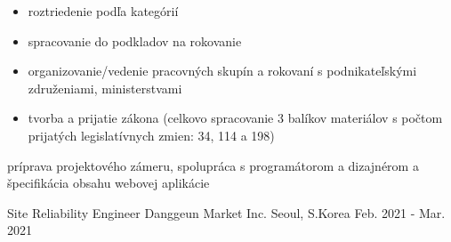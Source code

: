 \begin{cventries}
{\begin{cvitems}
\begin{itemize}[leftmargin=3ex, label=\bullet]
          \item {roztriedenie podľa kategórií}
          \item {spracovanie do podkladov na rokovanie}
          \item {organizovanie/vedenie pracovných skupín a rokovaní s podnikateľskými združeniami, ministerstvami}
          \item {tvorba a prijatie zákona (celkovo spracovanie 3 balíkov materiálov s počtom prijatých legislatívnych zmien: 34, 114 a 198)}
        \end{itemize}
        \item {príprava projektového zámeru, spolupráca s programátorom a dizajnérom a špecifikácia obsahu webovej aplikácie}
      \end{cvitems}
    }

  \cventry
    {Site Reliability Engineer} %
    {Danggeun Market Inc.} %
    {Seoul, S.Korea} %
    {Feb. 2021 - Mar. 2021} %
    {
    }


\end{cventries}
